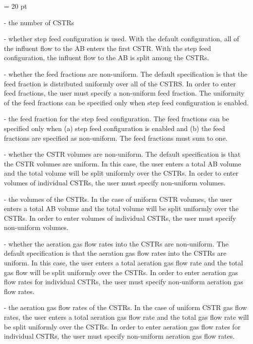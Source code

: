 {\parindent = 20 pt

\item{-} the number of CSTRs

\item{-} whether step feed configuration is used.  With the default
configuration, all of the influent flow to the AB enters the first CSTR.  With
the step feed configuration, the influent flow to the AB is split among the
CSTRs.

\item{-} whether the feed fractions are non-uniform. The default specification
is that the feed fraction is distributed uniformly over all of the CSTRS.  In
order to enter feed fractions, the user must specify a non-uniform feed
fraction.  The uniformity of the feed fractions can be specified only when step
feed configuration is enabled. 

\item{-} the feed fraction for the step feed configuration. The feed fractions
can be specified only when (a) step feed configuration is enabled and (b) the
feed fractions are specified as non-uniform.  The feed fractions must sum to
one. 

\item{-} whether the CSTR volumes are non-uniform. The default specification is
that the CSTR volumes are uniform.  In this case, the user enters a total AB
volume and the total volume will be split uniformly over the CSTRs. In order to
enter volumes of individual CSTRs, the user must specify non-uniform volumes.  

\item{-} the volumes of the CSTRs.  In the case of uniform CSTR volumes, the
user enters a total AB volume and the total volume will be split uniformly over
the CSTRs. In order to enter volumes of individual CSTRs, the user must specify
non-uniform volumes.  

\item{-} whether the aeration gas flow rates into the CSTRs are non-uniform.
The default specification is that the aeration gas flow rates into the CSTRs
are uniform.  In this case, the user enters a total aeration gas flow rate and
the total gas flow will be split uniformly over the CSTRs. In order to enter
aeration gas flow rates for individual CSTRs, the user must specify non-uniform
aeration gas flow rates.  

\item{-} the aeration gas flow rates of the CSTRs.  In the case of uniform CSTR
gas flow rates, the user enters a total aeration gas flow rate and the total
gas flow rate will be split uniformly over the CSTRs. In order to enter
aeration gas flow rates for individual CSTRs, the user must specify non-uniform
aeration gas flow rates.  

}

